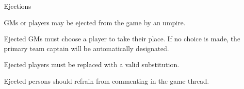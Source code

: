 \begin{deepEnumerate}
	\item Ejections
	\begin{deepEnumerate}
		\item GMs or players may be ejected from the game by an umpire.
		\begin{deepEnumerate}
			\item Ejected GMs must choose a player to take their place. If no choice is made, the primary team captain will be automatically designated.
			\item Ejected players must be replaced with a valid substitution.
			\item Ejected persons should refrain from commenting in the game thread.
		\end{deepEnumerate}
	\end{deepEnumerate}
\end{deepEnumerate}
